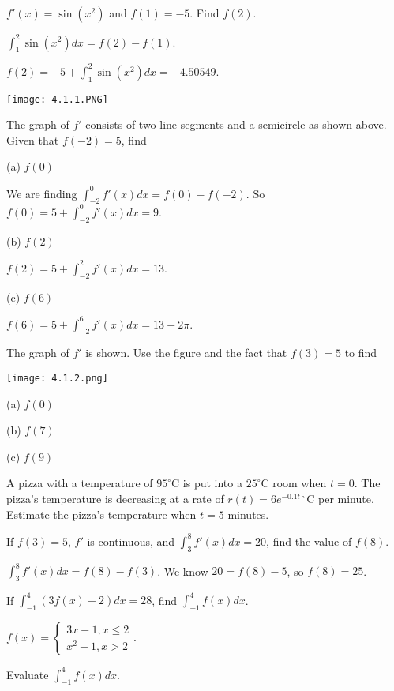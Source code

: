 \documentclass[../bccalc.tex]{subfiles}
\begin{document}
\begin{example}
    $f'(x)=\sin(x^2)$ and $f(1)=-5$. Find $f(2)$.

    $\int_1^2 \sin(x^2)dx=f(2)-f(1)$.

    $f(2)=-5+\int_1^2 \sin(x^2)dx = -4.50549$.
\end{example}
\pagebreak
\begin{example}
    \begin{center}
        \texttt{[image: 4.1.1.PNG]}
    \end{center}
    The graph of $f'$ consists of two line segments and a semicircle as shown above. Given that $f(-2)=5$, find 

    (a) $f(0)$

    We are finding $\int_{-2}^0 f'(x)dx=f(0)-f(-2)$. So $f(0)=5+\int_{-2}^0 f'(x)dx = 9$.

    (b) $f(2)$

    $f(2)=5+\int_{-2}^2 f'(x)dx=13$.

    (c) $f(6)$

    $f(6)=5+\int_{-2}^6 f'(x)dx=13-2\pi$.
\end{example}

\ex The graph of $f'$ is shown. Use the figure and the fact that $f(3)=5$ to find 
\begin{center}
    \texttt{[image: 4.1.2.png]}
\end{center}
(a) $f(0)$

(b) $f(7)$

(c) $f(9)$

\ex A pizza with a temperature of $95^{\circ}$C is put into a $25^{\circ}$C room when $t=0$. The pizza's temperature is decreasing at a rate of $r(t)=6e^{-0.1t\circ}$C per minute. Estimate the pizza's temperature when $t=5$ minutes.

\begin{example}
    If $f(3)=5$, $f'$ is continuous, and $\int_3^8 f'(x)dx=20$, find the value of $f(8)$.

    $\int_3^8 f'(x)dx=f(8)-f(3)$. We know $20=f(8)-5$, so $f(8)=25$.
\end{example}

\ex If $\int_{-1}^4 (3f(x)+2)dx=28$, find $\int_{-1}^4 f(x)dx$.

\ex $f(x)=\begin{cases}
    3x-1, x\leq 2\\
    x^2+1, x>2
\end{cases}$.

Evaluate $\int_{-1}^4 f(x)dx$.
\end{document}

